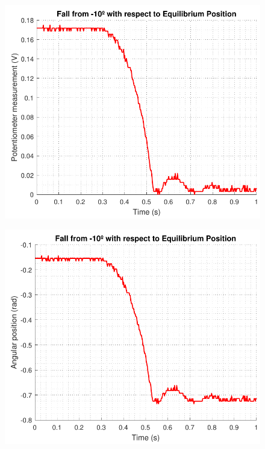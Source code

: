 \begin{minipage}{\linewidth}
	\begin{minipage}{0.45\linewidth}
		\begin{figure}[H]
			\includegraphics[scale=.53]{figures/tenDegFallVolt}
			\captionsetup{justification=centering}
			\label{tenDegFallVolt}
		\end{figure}%
	\end{minipage}
	\hspace{0.03\linewidth}
	\begin{minipage}{0.45\linewidth}
		\begin{figure}[H]

			\includegraphics[scale=.53]{figures/tenDegFallRad}
			\captionsetup{justification=centering}
			\label{tenDegFallRad}
		\end{figure}%
	\end{minipage}
\end{minipage} 


